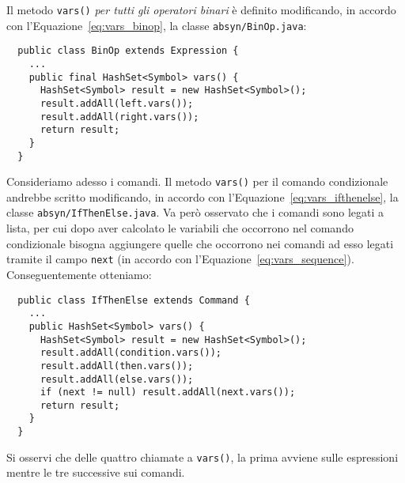 Il metodo \texttt{vars()}
\emph{per tutti gli operatori binari} \`e definito modificando, in accordo
con l'Equazione~\eqref{eq:vars_binop}, la classe \texttt{absyn/BinOp.java}:
%
\begin{verbatim}
  public class BinOp extends Expression {
    ...
    public final HashSet<Symbol> vars() {
      HashSet<Symbol> result = new HashSet<Symbol>();
      result.addAll(left.vars());
      result.addAll(right.vars());
      return result;
    }
  }
\end{verbatim}
%

Consideriamo adesso i comandi. Il metodo \texttt{vars()} per il comando
condizionale andrebbe scritto modificando, in accordo con
l'Equazione~\eqref{eq:vars_ifthenelse}, la classe
\texttt{absyn/IfThenElse.java}. Va per\`o osservato che i comandi sono
legati a lista, per cui dopo aver calcolato le variabili che occorrono nel
comando condizionale bisogna aggiungere quelle che occorrono nei comandi
ad esso legati tramite il campo \texttt{next}
(in accordo con l'Equazione~\eqref{eq:vars_sequence}).
Conseguentemente otteniamo:
%
\begin{verbatim}
  public class IfThenElse extends Command {
    ...
    public HashSet<Symbol> vars() {
      HashSet<Symbol> result = new HashSet<Symbol>();
      result.addAll(condition.vars());
      result.addAll(then.vars());
      result.addAll(else.vars());
      if (next != null) result.addAll(next.vars());
      return result;
    }
  }
\end{verbatim}
%
Si osservi che delle quattro chiamate a \texttt{vars()}, la prima avviene
sulle espressioni mentre le tre successive sui comandi.

